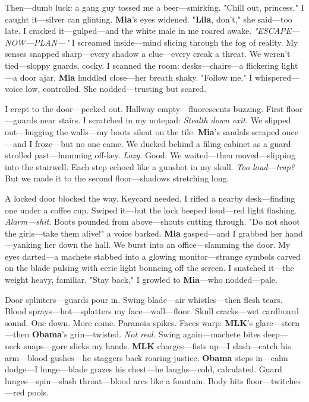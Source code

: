 \documentclass{article}
\begin{document}
Then—dumb luck: a gang guy tossed me a beer—smirking. "Chill out, princess." I caught it—silver can glinting. \textbf{Mia}’s eyes widened. "\textbf{Lila}, don’t," she said—too late. I cracked it—gulped—and the white male in me roared awake. \textit{"ESCAPE—NOW—PLAN—"} I screamed inside—mind slicing through the fog of reality. My senses snapped sharp—every shadow a clue—every creak a threat. We weren’t tied—sloppy guards, cocky. I scanned the room: desks—chairs—a flickering light—a door ajar. \textbf{Mia} huddled close—her breath shaky. "Follow me," I whispered—voice low, controlled. She nodded—trusting but scared.

I crept to the door—peeked out. Hallway empty—fluorescents buzzing. First floor—guards near stairs. I scratched in my notepad: \textit{Stealth down exit.} We slipped out—hugging the walls—my boots silent on the tile. \textbf{Mia}’s sandals scraped once—and I froze—but no one came. We ducked behind a filing cabinet as a guard strolled past—humming off-key. \textit{Lazy.} Good. We waited—then moved—slipping into the stairwell. Each step echoed like a gunshot in my skull. \textit{Too loud—trap?} But we made it to the second floor—shadows stretching long.

A locked door blocked the way. Keycard needed. I rifled a nearby desk—finding one under a coffee cup. Swiped it—but the lock beeped loud—red light flashing. \textit{Alarm—shit.} Boots pounded from above—shouts cutting through. "Do not shoot the girls—take them alive!" a voice barked. \textbf{Mia} gasped—and I grabbed her hand—yanking her down the hall. We burst into an office—slamming the door. My eyes darted—a machete stabbed into a glowing monitor—strange symbols carved on the blade pulsing with eerie light bouncing off the screen. I snatched it—the weight heavy, familiar. "Stay back," I growled to \textbf{Mia}—who nodded—pale.

Door splinters—guards pour in. Swing blade—air whistles—then flesh tears. Blood sprays—hot—splatters my face—wall—floor. Skull cracks—wet cardboard sound. One down. More come. Paranoia spikes. Faces warp: \textbf{MLK}’s glare—stern—then \textbf{Obama}’s grin—twisted. \textit{Not real.} Swing again—machete bites deep—neck snaps—gore slicks my hands. \textbf{MLK} charges—fists up—I slash—catch his arm—blood gushes—he staggers back roaring justice. \textbf{Obama} steps in—calm dodge—I lunge—blade grazes his chest—he laughs—cold, calculated. Guard lunges—spin—slash throat—blood arcs like a fountain. Body hits floor—twitches—red pools.
\end{document}
